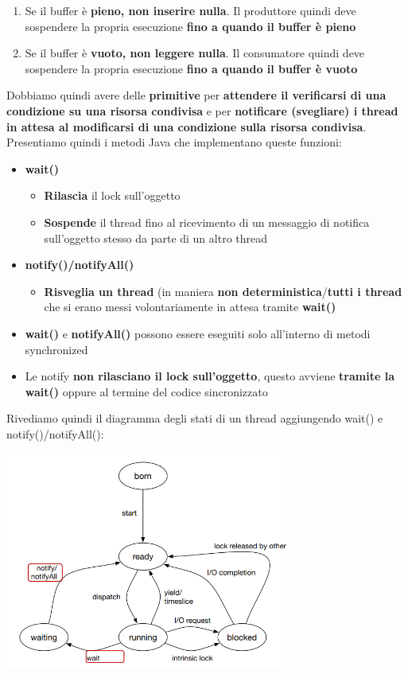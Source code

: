 \documentclass[12pt]{article}
\begin{document}
\begin{enumerate}
    \item Se il buffer è \textbf{pieno, non inserire nulla}. Il produttore quindi deve sospendere la propria esecuzione \textbf{fino a quando il buffer è pieno}
    \item Se il buffer è \textbf{vuoto, non leggere nulla}. Il consumatore quindi deve sospendere la propria esecuzione \textbf{fino a quando il buffer è vuoto}
\end{enumerate}
Dobbiamo quindi avere delle \textbf{primitive} per \textbf{attendere il verificarsi di una condizione su una risorsa condivisa} e per \textbf{notificare (svegliare) i thread in attesa al modificarsi di una condizione sulla risorsa condivisa}. Presentiamo quindi i metodi Java che implementano queste funzioni:
\begin{itemize}
    \item \textbf{wait()}
          \begin{itemize}
              \item \textbf{Rilascia} il lock sull'oggetto
              \item \textbf{Sospende} il thread fino al ricevimento di un messaggio di notifica sull'oggetto stesso da parte di un altro thread
          \end{itemize}
    \item \textbf{notify()/notifyAll()}
          \begin{itemize}
              \item \textbf{Risveglia un thread} (in maniera \textbf{non deterministica}/\textbf{tutti i thread}  che si erano messi volontariamente in attesa tramite \textbf{wait()}
          \end{itemize}
    \item \textbf{wait()} e \textbf{notifyAll()} possono essere eseguiti solo all'interno di metodi synchronized
    \item Le notify \textbf{non rilasciano il lock sull'oggetto}, questo avviene \textbf{tramite la wait()} oppure al termine del codice sincronizzato
\end{itemize}
Rivediamo quindi il diagramma degli stati di un thread aggiungendo wait() e notify()/notifyAll():
\begin{center}
    \includegraphics[width = 0.70\textwidth]{Images/87.png}
\end{center}
\end{document}
